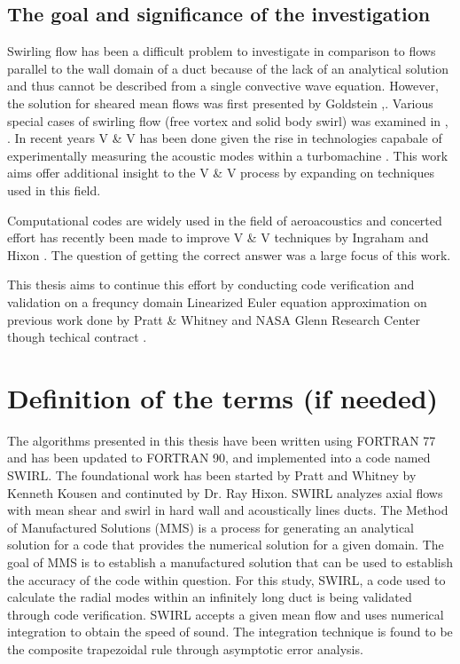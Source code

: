 \subsection{The goal and significance of the investigation}
Swirling flow has been a difficult problem to investigate in comparison to 
flows parallel to the wall domain of a duct \cite{COOPER2001} because of the 
lack of an analytical solution and thus cannot be described from a single convective 
wave equation. However, the solution for sheared mean flows was first presented
by Goldstein \cite{Goldstein1978},\cite{Goldstein1979}. Various special cases of
swirling flow (free vortex and solid body swirl) was examined in \cite{KAPUR1973}
\cite{Kerrebrock2012}, \cite{KERREBROCK1974}. In recent years V \& V has been 
done given the rise in technologies capabale of experimentally
measuring the acoustic modes within a turbomachine \cite{Maldonado2016}. This
work aims offer additional insight to the V \& V process 
by expanding on techniques used in this field.  

Computational codes are widely used in the field of aeroacoustics and concerted
effort has recently been made to improve V \& V techniques 
by Ingraham and Hixon \cite{Ingraham2015,Ingraham2010}. The question of getting 
the correct answer was a large focus of this work. 

This thesis aims to continue this effort by conducting code verification and validation on a frequncy domain 
Linearized Euler equation approximation on previous work done by Pratt \& Whitney
and NASA Glenn Research Center though techical contract \cite{kousen1996pressure,kousen1995eigenmode}.  

\section{Definition of the terms (if needed)}

The algorithms presented in this thesis have been written using FORTRAN 77 and 
has been updated to FORTRAN 90, and implemented into a code named SWIRL. The 
foundational work has been started by Pratt and Whitney by Kenneth Kousen 
\cite{kousen1996pressure} and continuted by Dr. Ray Hixon. SWIRL analyzes 
axial flows with mean shear and swirl in hard wall and acoustically lines ducts.
The Method of Manufactured Solutions (MMS) is a process for generating an 
analytical solution for a code that provides the numerical solution for a 
given domain. The goal of MMS is to establish a manufactured solution that can 
be used to establish the accuracy of the code within question. For this study, 
SWIRL, a code used to calculate the radial modes within an infinitely long duct
is being validated through code verification. SWIRL accepts a given mean flow and 
uses numerical integration to obtain the speed of sound. The integration technique
is found to be the composite trapezoidal rule through asymptotic error analysis.

